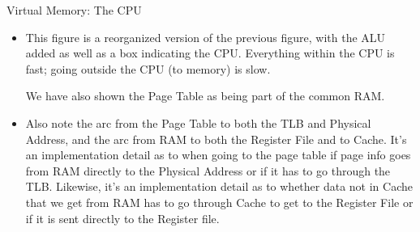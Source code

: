 





\begin{frame}[fragile]{Virtual Memory: The CPU}

\BNotes\ifnum{}
\begin{itemize}
\item This figure is a reorganized version of the previous figure, with the
	ALU added as well as a box indicating the CPU.  Everything within
	the CPU is fast; going outside the CPU (to memory) is slow.

	We have also shown the Page Table as being part of the common RAM.
\item Also note the arc from the Page Table to both the TLB and Physical Address, and the arc from RAM to both the Register File and to Cache.  It's an implementation detail as to when going to the page table if page info goes from RAM directly to the Physical Address or if it has to go through the TLB.  Likewise, it's an implementation detail as to whether data not in Cache that we get from RAM has to go through Cache to get to the Register File or if it is sent directly to the Register file.
\end{itemize}
\fi\ENotes
\end{frame}

